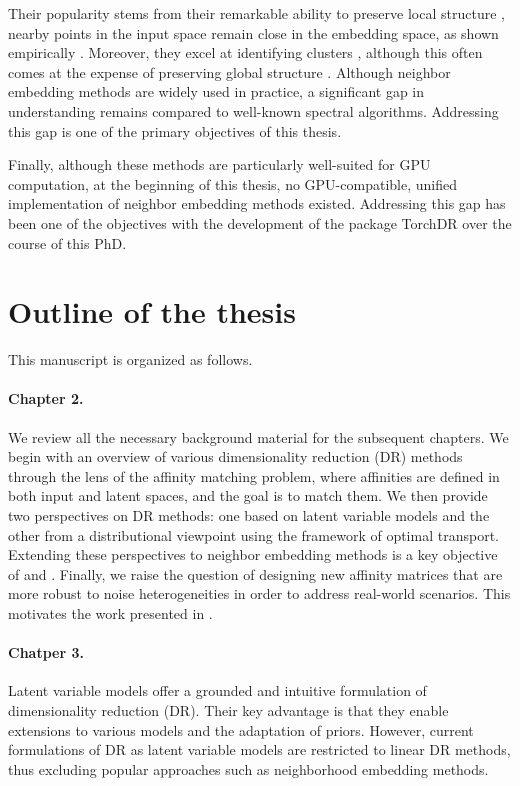 Their popularity stems from their remarkable ability to preserve local structure \ie, nearby points in the input space remain close in the embedding space, as shown empirically \citep{wang2021understanding}. Moreover, they excel at identifying clusters \citep{arora2018analysis, linderman2019clustering}, although this often comes at the expense of preserving global structure \citep{wattenberg2016use, coenen2019understanding}. Although neighbor embedding methods are widely used in practice, a significant gap in understanding remains compared to well-known spectral algorithms. Addressing this gap is one of the primary objectives of this thesis.

Finally, although these methods are particularly well-suited for GPU computation, at the beginning of this thesis, no GPU-compatible, unified implementation of neighbor embedding methods existed. Addressing this gap has been one of the objectives with the development of the package TorchDR \citep{vanassel2024torchdr} over the course of this PhD.

\section{Outline of the thesis}

This manuscript is organized as follows.

\paragraph{Chapter 2.}
We review all the necessary background material for the subsequent chapters. We begin with an overview of various dimensionality reduction (DR) methods through the lens of the affinity matching problem, where affinities are defined in both input and latent spaces, and the goal is to match them. We then provide two perspectives on DR methods: one based on latent variable models and the other from a distributional viewpoint using the framework of optimal transport. Extending these perspectives to neighbor embedding methods is a key objective of  and . Finally, we raise the question of designing new affinity matrices that are more robust to noise heterogeneities in order to address real-world scenarios. This motivates the work presented in .

\paragraph{Chatper 3.} 
Latent variable models offer a grounded and intuitive formulation of dimensionality reduction (DR). Their key advantage is that they enable extensions to various models and the adaptation of priors. However, current formulations of DR as latent variable models are restricted to linear DR methods, thus excluding popular approaches such as neighborhood embedding methods. 

